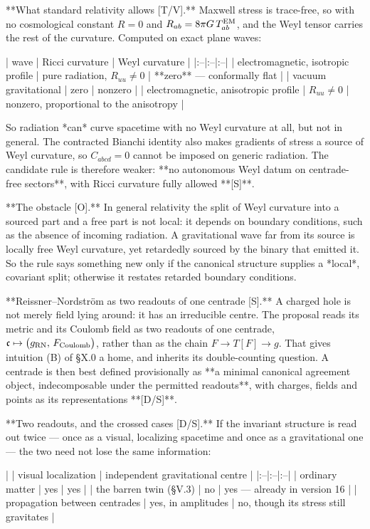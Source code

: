**What standard relativity allows [T/V].** Maxwell stress is trace-free, so with no cosmological constant $R = 0$ and $R_{ab} = 8\pi G\,T^{\rm EM}_{ab}$, and the Weyl tensor carries the rest of the curvature. Computed on exact plane waves:

| wave | Ricci curvature | Weyl curvature |
|:--|:--|:--|
| electromagnetic, isotropic profile | pure radiation, $R_{uu}\neq0$ | **zero** — conformally flat |
| vacuum gravitational | zero | nonzero |
| electromagnetic, anisotropic profile | $R_{uu}\neq0$ | nonzero, proportional to the anisotropy |

So radiation *can* curve spacetime with no Weyl curvature at all, but not in general. The contracted Bianchi identity also makes gradients of stress a source of Weyl curvature, so $C_{abcd} = 0$ cannot be imposed on generic radiation. The candidate rule is therefore weaker: **no autonomous Weyl datum on centrade-free sectors**, with Ricci curvature fully allowed **[S]**.

**The obstacle [O].** In general relativity the split of Weyl curvature into a sourced part and a free part is not local: it depends on boundary conditions, such as the absence of incoming radiation. A gravitational wave far from its source is locally free Weyl curvature, yet retardedly sourced by the binary that emitted it. So the rule says something new only if the canonical structure supplies a *local*, covariant split; otherwise it restates retarded boundary conditions.

**Reissner–Nordström as two readouts of one centrade [S].** A charged hole is not merely field lying around: it has an irreducible centre. The proposal reads its metric and its Coulomb field as two readouts of one centrade, $\mathfrak c\mapsto\big(g_{\rm RN},\,F_{\rm Coulomb}\big)$, rather than as the chain $F\to T[F]\to g$. That gives intuition (B) of §X.0 a home, and inherits its double-counting question. A centrade is then best defined provisionally as **a minimal canonical agreement object, indecomposable under the permitted readouts**, with charges, fields and points as its representations **[D/S]**.

**Two readouts, and the crossed cases [D/S].** If the invariant structure is read out twice — once as a visual, localizing spacetime and once as a gravitational one — the two need not lose the same information:

| | visual localization | independent gravitational centre |
|:--|:--|:--|
| ordinary matter | yes | yes |
| the barren twin (§V.3) | no | yes — already in version 16 |
| propagation between centrades | yes, in amplitudes | no, though its stress still gravitates |

